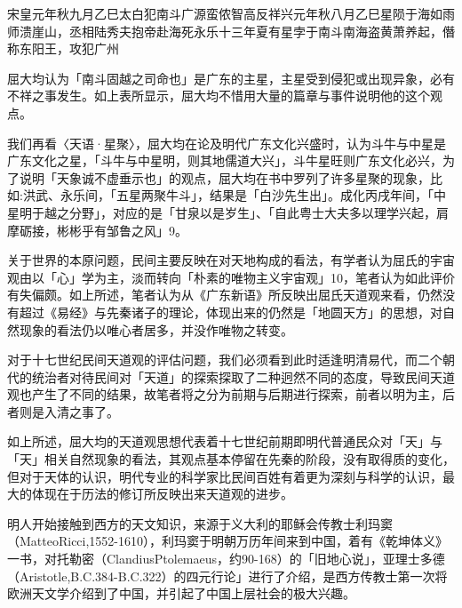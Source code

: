 \noindent 宋皇元年秋九月乙巳太白犯南斗广源蛮侬智高反祥兴元年秋八月乙巳星陨于海如雨师溃崖山，丞相陆秀夫抱帝赴海死永乐十三年夏有星孛于南斗南海盗黄萧养起，僭称东阳王，攻犯广州

屈大均认为「南斗固越之司命也」是广东的主星，主星受到侵犯或出现异象，必有不祥之事发生。如上表所显示，屈大均不惜用大量的篇章与事件说明他的这个观点。

我们再看〈天语·星聚〉，屈大均在论及明代广东文化兴盛时，认为斗牛与中星是广东文化之星，「斗牛与中星明，则其地儒道大兴」，斗牛星旺则广东文化必兴，为了说明「天象诚不虚垂示也」的观点，屈大均在书中罗列了许多星聚的现象，比如:洪武、永乐间，「五星两聚牛斗」，结果是「白沙先生出」。成化丙戌年间，「中星明于越之分野」，对应的是「甘泉以是岁生」、「自此粤士大夫多以理学兴起，肩摩砺接，彬彬乎有邹鲁之风」9。

关于世界的本原问题，民间主要反映在对天地构成的看法，有学者认为屈氏的宇宙观由以「心」学为主，淡而转向「朴素的唯物主义宇宙观」10，笔者认为如此评价有失偏颇。如上所述，笔者认为从《广东新语》所反映出屈氏天道观来看，仍然没有超过《易经》与先秦诸子的理论，体现出来的仍然是「地圆天方」的思想，对自然现象的看法仍以唯心者居多，并没作唯物之转变。


对于十七世纪民间天道观的评估问题，我们必须看到此时适逢明清易代，而二个朝代的统治者对待民间对「天道」的探索探取了二种迥然不同的态度，导致民间天道观也产生了不同的结果，故笔者将之分为前期与后期进行探索，前者以明为主，后者则是入清之事了。

\vfill
\begin{BookNotes}
\end{BookNotes}

如上所述，屈大均的天道观思想代表着十七世纪前期即明代普通民众对「天」与「天」相关自然现象的看法，其观点基本停留在先秦的阶段，没有取得质的变化，但对于天体的认识，明代专业的科学家比民间百姓有着更为深刻与科学的认识，最大的体现在于历法的修订所反映出来天道观的进步。

明人开始接触到西方的天文知识，来源于义大利的耶稣会传教士利玛窦（MatteoRicci,1552-1610），利玛窦于明朝万历年间来到中国，着有《乾坤体义》一书，对托勒密（ClandiusPtolemaeus，约90-168）的「旧地心说」，亚理士多德（Aristotle,B.C.384-B.C.322）的四元行论」进行了介绍，是西方传教士第一次将欧洲天文学介绍到了中国，并引起了中国上层社会的极大兴趣。

